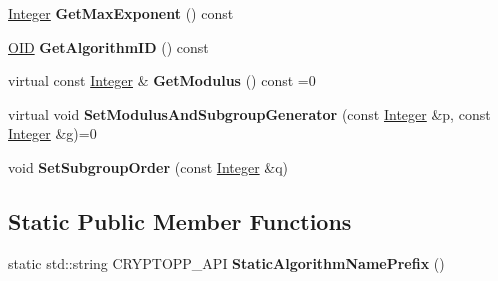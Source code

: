 \begin{DoxyCompactItemize}
\item 
\hypertarget{class_d_l___group_parameters___integer_based_ace4fcdf4165ac0790d13ec4efefad60c}{
\hyperlink{class_integer}{Integer} {\bfseries GetMaxExponent} () const }
\label{class_d_l___group_parameters___integer_based_ace4fcdf4165ac0790d13ec4efefad60c}

\item 
\hypertarget{class_d_l___group_parameters___integer_based_acad8430adfe4468e036cb23f2b09b0e0}{
\hyperlink{class_o_i_d}{OID} {\bfseries GetAlgorithmID} () const }
\label{class_d_l___group_parameters___integer_based_acad8430adfe4468e036cb23f2b09b0e0}

\item 
\hypertarget{class_d_l___group_parameters___integer_based_a52d7e7ae466b7471d19d02382bf612ec}{
virtual const \hyperlink{class_integer}{Integer} \& {\bfseries GetModulus} () const =0}
\label{class_d_l___group_parameters___integer_based_a52d7e7ae466b7471d19d02382bf612ec}

\item 
\hypertarget{class_d_l___group_parameters___integer_based_a2d0b7b0fc71ec3a656e4f1a3095b158b}{
virtual void {\bfseries SetModulusAndSubgroupGenerator} (const \hyperlink{class_integer}{Integer} \&p, const \hyperlink{class_integer}{Integer} \&g)=0}
\label{class_d_l___group_parameters___integer_based_a2d0b7b0fc71ec3a656e4f1a3095b158b}

\item 
\hypertarget{class_d_l___group_parameters___integer_based_a5a842eff8fb870a0c9a61831a9865342}{
void {\bfseries SetSubgroupOrder} (const \hyperlink{class_integer}{Integer} \&q)}
\label{class_d_l___group_parameters___integer_based_a5a842eff8fb870a0c9a61831a9865342}

\end{DoxyCompactItemize}
\subsection*{Static Public Member Functions}
\begin{DoxyCompactItemize}
\item 
\hypertarget{class_d_l___group_parameters___integer_based_a3a570760be1a6d58a803da8655c071a6}{
static std::string CRYPTOPP\_\-API {\bfseries StaticAlgorithmNamePrefix} ()}
\label{class_d_l___group_parameters___integer_based_a3a570760be1a6d58a803da8655c071a6}

\end{DoxyCompactItemize}
